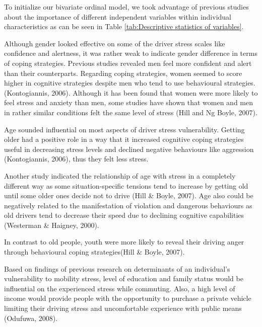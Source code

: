 \documentclass[
11pt, %
oneside, %
english, %
singlespacing, %
]{macthesis} %
\begin{document}
To initialize our bivariate ordinal model, we took advantage of previous studies about the importance of different independent variables within individual characteristics as can be seen in Table \ref{tab:Descriptive statistics of variables}.

Although gender looked effective on some of the driver stress scales like confidence and alertness, it was rather weak to indicate gender difference in terms of coping strategies. Previous studies revealed men feel more confident and alert than their counterparts. Regarding coping strategies, women seemed to score higher in cognitive strategies despite men who tend to use behavioural strategies. (Kontogiannis, 2006). Although it has been found that women were more likely to feel stress and anxiety than men, some studies have shown that women and men in rather similar conditions felt the same level of stress (Hill and Ng Boyle, 2007).

Age sounded influential on most aspects of driver stress vulnerability. Getting older had a positive role in a way that it increased cognitive coping strategies useful in decreasing stress levels and declined negative behaviours like aggression (Kontogiannis, 2006), thus they felt less stress.

Another study indicated the relationship of age with stress in a completely different way as some situation-specific tensions tend to increase by getting old until some older ones decide not to drive (Hill \& Boyle, 2007). Age also could be negatively related to the manifestation of violation and dangerous behaviours as old drivers tend to decrease their speed due to declining cognitive capabilities (Westerman \& Haigney, 2000).

In contrast to old people, youth were more likely to reveal their driving anger through behavioural coping strategies(Hill \& Boyle, 2007).

Based on findings of previous research on determinants of an individual's vulnerability to mobility stress, level of education and family status would be influential on the experienced stress while commuting. Also, a high level of income would provide people with the opportunity to purchase a private vehicle limiting their driving stress and uncomfortable experience with public means (Odufuwa, 2008).
\end{document}
